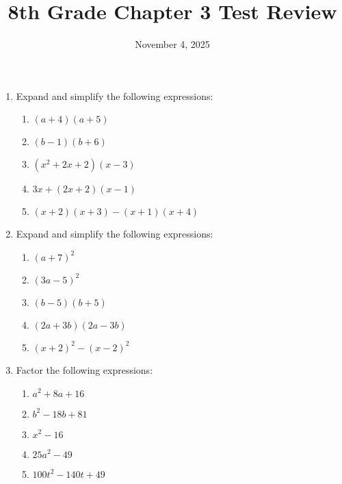 \documentclass[12pt]{article}
\title{8th Grade Chapter 3 Test Review}
\date{November 4, 2025}
\begin{document}
\maketitle

\begin{enumerate}
    \item Expand and simplify the following expressions:
    \begin{enumerate}
        \item $(a+4)(a+5)$
        \item $(b-1)(b+6)$
        \item $(x^2+2x+2)(x-3)$
        \item $3x + (2x+2)(x-1)$
        \item $(x+2)(x+3) - (x+1)(x+4)$
    \end{enumerate}
    \item Expand and simplify the following expressions:
    \begin{enumerate}
        \item $(a+7)^2$
        \item $(3a-5)^2$
        \item $(b-5)(b+5)$
        \item $(2a+3b)(2a-3b)$
        \item $(x+2)^2 - (x-2)^2$
    \end{enumerate}
    \item Factor the following expressions:
    \begin{enumerate}
        \item $a^2+8a+16$
        \item $b^2-18b+81$
        \item $x^2 - 16$
        \item $25a^2 - 49$
        \item $100t^2 - 140t + 49$
    \end{enumerate}
\end{enumerate}
\end{document}
